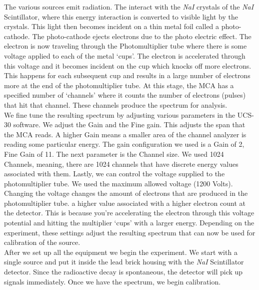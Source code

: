 \documentclass[%
 reprint,
 amsmath,amssymb,
 aps,
]{revtex4-1}
\begin{document}
The various sources emit \gp radiation. The \gp interact with the \textit{NaI} crystals of the \textit{NaI} Scintillator, where this energy interaction is converted to visible light by the crystals. This light then becomes incident on a thin metal foil called a photo-cathode. The photo-cathode ejects electrons due to the  photo electric effect\cite{WPEE}. The electron is now traveling through the Photomultiplier tube where there is some voltage applied to each of the metal `cups'. The electron is accelerated through this voltage and it becomes incident on the cup which knocks off more electrons. This happens for each subsequent cup and results in a large number of electrons more at the end of the photomultiplier tube. At this stage, the MCA has a specified number of `channels' where it counts the number of electrons (pulses) that hit that channel. These channels produce the spectrum for analysis.\\

We fine tune the resulting spectrum by adjusting various parameters in the UCS-30 software. We  adjust the Gain and the Fine gain. This adjusts the span that the MCA reads. A higher Gain means a smaller area of the channel analyzer is reading some particular energy. The gain configuration we used is a Gain of 2, Fine Gain of 11. The next parameter is the Channel size. We used 1024 Channels, meaning, there are 1024 channels that have discrete energy values associated with them. Lastly, we can control the voltage supplied to the photomultiplier tube. We used the maximum allowed voltage (1200 Volts). Changing the voltage changes the amount of electrons that are produced in the photomultiplier tube. a higher value associated with a higher electron count at the detector. This is because you're accelerating the electron through this voltage potential and hitting the multiplier `cups' with a larger energy. Depending on the experiment, these settings  adjust the resulting spectrum that can now be used for calibration of the source.\\

After we set up all the equipment we begin the experiment. We start with a single source and put it inside the lead brick housing with the \textit{NaI} Scintillator detector. Since the radioactive decay is spontaneous, the detector will pick up signals immediately. Once we have the spectrum, we begin calibration.\\
\end{document}
